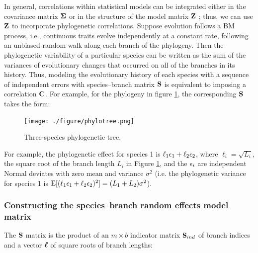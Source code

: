 \documentclass[12pt]{article}
\begin{document}
In general, correlations within statistical models can be integrated either in the 
covariance matrix ${\boldsymbol \Sigma}$ or in the structure of the model matrix ${\mathbf Z}$ \citep{hefley2017basis};
thus, we can use ${\mathbf Z}$ to incorporate phylogenetic correlations.
Suppose evolution follows a BM process, i.e., continuous traits evolve independently at a constant rate, following an unbiased random walk along each branch of the phylogeny.
Then the phylogenetic variability of a particular species can be written as the sum of the variances of evolutionary changes that occurred on all of the branches in its history. 
Thus, modeling the evolutionary history of each species with a sequence of independent errors with species--branch matrix ${\mathbf S}$ is equivalent to imposing a correlation ${\mathbf C}$.
For example, for the phylogeny in figure \ref{fig:tree}, the corresponding ${\mathbf S}$ takes the form:

\begin{center}
\begin{figure}[H]
  \texttt{[image: ./figure/phylotree.png]}
  \caption{Three-species phylogenetic tree.}
\label{fig:tree}
\end{figure}
\end{center}



For example, the phylogenetic effect for species 1 is $\ell_1 { \epsilon}_1 + \ell_2 { \epsilon}_2$, where $\ell_i = \sqrt{L_i}$, the square root of the branch length $L_i$ in Figure \ref{fig:tree}, and the ${ \epsilon}_i$ are independent Normal deviates with zero mean and variance $\sigma^2$ (i.e. the phylogenetic variance for species 1 is $\textrm{E}[(\ell_1 { \epsilon}_1 + \ell_2 { \epsilon}_2)^2] = (L_1 + L_2)\sigma^2$).

\subsubsection*{Constructing the species--branch random effects model matrix}

The ${\mathbf S}$ matrix is the product of an $m \times b$ indicator matrix ${\mathbf S}_{ind}$ of branch indices and a vector ${\boldsymbol \ell}$ of square roots of branch lengths:
\end{document}
